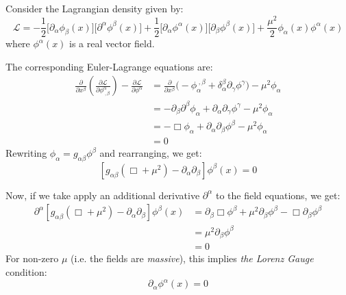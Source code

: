 \documentclass[letterpaper,12pt]{article}
\newenvironment{problem}{\subsection{}\begin{adjustwidth}{0.25in}{}\vspace{-\baselineskip}}{\end{adjustwidth}}
\newcommand{\pder}[2]{\frac{\partial #1}{\partial #2}}
\newcommand{\lagr}{\mathscr{L}}
\DeclareMathOperator{\dalem}{\Box}
\newcommand{\done}{\tag*{$\blacksquare$}}
\begin{document}
\begin{problem}
Consider the Lagrangian density given by:
\begin{equation*}
	\lagr = -\frac{1}{2}\big[\partial_\alpha\phi_\beta(x)\big]\big[\partial^\alpha\phi^\beta(x)\big] +
	\frac{1}{2}\big[\partial_\alpha\phi^\alpha(x)\big]\big[\partial_\beta\phi^\beta(x)\big] +
	\frac{\mu^2}{2}\phi_\alpha(x)\phi^\alpha(x)
\end{equation*}
where $\phi^\alpha(x)$ is a real vector field.

The corresponding Euler-Lagrange equations are:
\begin{align*}
	\pder{}{x^\beta}\left(\pder{\lagr}{\phi^\alpha_{\;,\beta}}\right) - \pder{\lagr}{\phi^\alpha}
	&= \pder{}{x^\beta}\Big(-\phi_\alpha^{\;,\beta} + \delta^\beta_\alpha \partial_\gamma\phi^\gamma\Big) - \mu^2\phi_\alpha	\\
	&= -\partial_\beta \partial^\beta \phi_\alpha + \partial_\alpha \partial_\gamma \phi^\gamma - \mu^2\phi_\alpha	\\
	&= -\dalem\phi_\alpha + \partial_\alpha\partial_\beta \phi^\beta - \mu^2\phi_\alpha	\\
	&= 0
\end{align*}
Rewriting $\phi_\alpha = g_{\alpha\beta} \phi^\beta$ and rearranging, we get:
\begin{equation*}
	\left[g_{\alpha\beta}\left(\dalem +\mu^2\right) - \partial_\alpha\partial_\beta\right]\phi^\beta(x) = 0		\done
\end{equation*}

Now, if we take apply an additional derivative $\partial^\alpha$ to the field equations, we get:
\begin{align*}
	\partial^\alpha\left[g_{\alpha\beta}\left(\dalem+\mu^2\right) - \partial_\alpha\partial_\beta\right]\phi^\beta(x)
	&= \partial_\beta \dalem \phi^\beta + \mu^2 \partial_\beta\phi^\beta - \dalem \partial_\beta \phi^\beta	\\
	&= \mu^2 \partial_\beta \phi^\beta	\\
	&= 0
\end{align*}
For non-zero $\mu$ (i.e. the fields are \emph{massive}), this implies \emph{the Lorenz Gauge} condition:
\begin{equation*}
	\partial_\alpha \phi^\alpha (x) = 0			\done
\end{equation*}
\end{problem}
\end{document}
